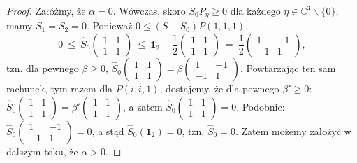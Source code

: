 \begin{proof}
Załóżmy, że $\alpha = 0$.
Wówczas, skoro $S_{0} P_{\eta} \geq 0$ dla każdego
$\eta \in \mathbb{C}^{3}\backslash\{0\}$,
mamy $S_{1} = S_{2} = 0$.
Ponieważ
$0 \leq (S - S_{0}) P(1,1,1)$,
\begin{equation}
0 \: \leq \: \hat{S}_{0} \begin{pmatrix}
    1 & 1 \\ 1 & 1
    \end{pmatrix} \: \leq \:
    \mathbf{1}_{2} - \frac{1}{2} \begin{pmatrix}
                1 & 1 \\ 1 & 1
                \end{pmatrix} \: = \:
    \frac{1}{2}
    \begin{pmatrix}
    1 & -1 \\ -1 & 1
    \end{pmatrix},
\end{equation}
tzn. dla pewnego $\beta \geq 0$,
$
\hat{S}_{0} \left( \begin{smallmatrix}
    1 & 1 \\ 1 & 1
    \end{smallmatrix} \right) =
    \beta \left(
    \begin{smallmatrix}
    1 & -1 \\ -1 & 1
    \end{smallmatrix} \right)
$.
Powtarzając ten sam rachunek, tym razem dla $P(i,i,1)$,
dostajemy, że dla pewnego $\beta' \geq 0$:
$
\hat{S}_{0} \left( \begin{smallmatrix}
    1 & 1 \\ 1 & 1
    \end{smallmatrix} \right) =
    \beta' \left(
    \begin{smallmatrix}
    1 & 1 \\ 1 & 1
    \end{smallmatrix} \right)
$,
a zatem
$
\hat{S}_{0} \left( \begin{smallmatrix}
    1 & 1 \\ 1 & 1
    \end{smallmatrix} \right) = 0
$.
Podobnie:
$
\hat{S}_{0} \left( \begin{smallmatrix}
    1 & -1 \\ -1 & 1
    \end{smallmatrix} \right) = 0
$, a stąd
$\hat{S}_{0}(\mathbf{1}_{2}) = 0$, tzn. $\hat{S}_{0} = 0$.
Zatem możemy założyć w dalszym toku, że $\alpha > 0$.


\end{proof}
